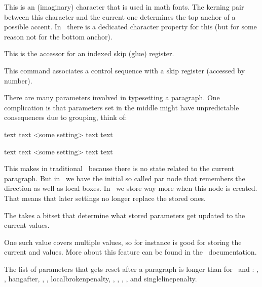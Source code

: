 This is an (imaginary) character that is used in math fonts. The kerning pair
between this character and the current one determines the top anchor of a
possible accent. In \OPENTYPE\ there is a dedicated character property for this
(but for some reason not for the bottom anchor).

\stopoldprimitive

\startoldprimitive[title={\prm {skip}}]

This is the accessor for an indexed skip (glue) register.

\stopoldprimitive

\startoldprimitive[title={\prm {skipdef}}]

This command associates a control sequence with a skip register (accessed by number).

\stopoldprimitive

\startnewprimitive[title={\prm {snapshotpar}}]

There are many parameters involved in typesetting a paragraph. One complication
is that parameters set in the middle might have unpredictable consequences due to
grouping, think of:

\starttyping
text  text <some setting> text   text \par
text {text <some setting> text } text \par
\stoptyping

This makes in traditional \TEX\ because there is no state related to the current
paragraph. But in \LUATEX\ we have the initial so called par node that remembers
the direction as well as local boxes. In \LUAMETATEX\ we store way more when this
node is created. That means that later settings no longer replace the stored ones.

The  takes a bitset that determine what stored parameters get
updated to the current values.

\startthreerows
{}
\stopthreerows

One such value covers multiple values, so for instance  is good for
storing the current  and  values. More about this
feature can be found in the \CONTEXT\ documentation.

The list of parameters that gets reset after a paragraph is longer than for
\PDFTEX\ and \LUAMETATEX: , , \prm
{hangafter}, , , \prm
{localbrokenpenalty}, , ,
, ,  and \prm
{singlelinepenalty}.

